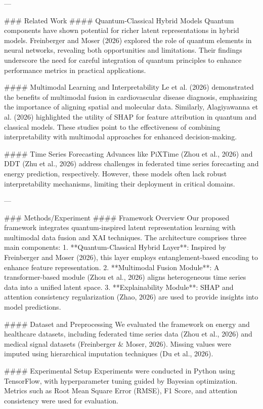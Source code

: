 ---

### Related Work  
#### Quantum-Classical Hybrid Models  
Quantum components have shown potential for richer latent representations in hybrid models. Freinberger and Moser (2026) explored the role of quantum elements in neural networks, revealing both opportunities and limitations. Their findings underscore the need for careful integration of quantum principles to enhance performance metrics in practical applications.

#### Multimodal Learning and Interpretability  
Le et al. (2026) demonstrated the benefits of multimodal fusion in cardiovascular disease diagnosis, emphasizing the importance of aligning spatial and molecular data. Similarly, Alagiyawanna et al. (2026) highlighted the utility of SHAP for feature attribution in quantum and classical models. These studies point to the effectiveness of combining interpretability with multimodal approaches for enhanced decision-making.

#### Time Series Forecasting  
Advances like PiXTime (Zhou et al., 2026) and DDT (Zhu et al., 2026) address challenges in federated time series forecasting and energy prediction, respectively. However, these models often lack robust interpretability mechanisms, limiting their deployment in critical domains.

---

### Methods/Experiment  
#### Framework Overview  
Our proposed framework integrates quantum-inspired latent representation learning with multimodal data fusion and XAI techniques. The architecture comprises three main components:  
1. **Quantum-Classical Hybrid Layer**: Inspired by Freinberger and Moser (2026), this layer employs entanglement-based encoding to enhance feature representation.  
2. **Multimodal Fusion Module**: A transformer-based module (Zhou et al., 2026) aligns heterogeneous time series data into a unified latent space.  
3. **Explainability Module**: SHAP and attention consistency regularization (Zhao, 2026) are used to provide insights into model predictions.

#### Dataset and Preprocessing  
We evaluated the framework on energy and healthcare datasets, including federated time series data (Zhou et al., 2026) and medical signal datasets (Freinberger & Moser, 2026). Missing values were imputed using hierarchical imputation techniques (Du et al., 2026).

#### Experimental Setup  
Experiments were conducted in Python using TensorFlow, with hyperparameter tuning guided by Bayesian optimization. Metrics such as Root Mean Square Error (RMSE), F1 Score, and attention consistency were used for evaluation.


